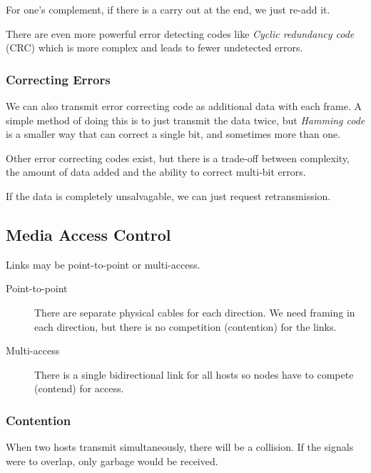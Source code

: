 \begin{note}
	For one's complement, if there is a carry out at the end, we just re-add it.
\end{note}

\begin{note}
	There are even more powerful error detecting codes like \emph{Cyclic redundancy code} (CRC) which is more complex and leads to fewer undetected errors.
\end{note}

\subsubsection{Correcting Errors}\label{ssub:correcting_errors}

We can also transmit error correcting code as additional data with each frame.
A simple method of doing this is to just transmit the data twice, but \emph{Hamming code} is a smaller way that can correct a single bit, and sometimes more than one.

Other error correcting codes exist, but there is a trade-off between complexity, the amount of data added and the ability to correct multi-bit errors.

\begin{note}
	If the data is completely unsalvagable, we can just request retransmission.
\end{note}

\subsection{Media Access Control}\label{sub:media_access_control}

Links may be point-to-point or multi-access.
\begin{description}
	\item[Point-to-point] There are separate physical cables for each direction.
		We need framing in each direction, but there is no competition (contention) for the links.
	\item[Multi-access] There is a single bidirectional link for all hosts so nodes have to compete (contend) for access.
\end{description}

\subsubsection{Contention}\label{ssub:contention}

When two hosts transmit simultaneously, there will be a collision.
If the signals were to overlap, only garbage would be received.

